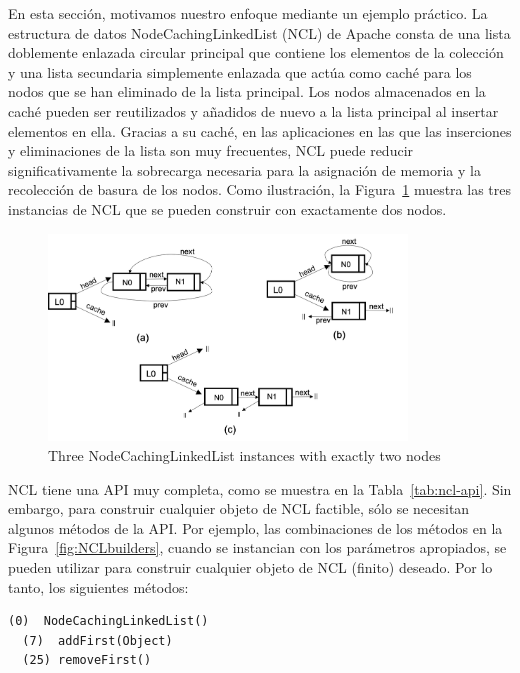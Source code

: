 En esta sección, motivamos nuestro enfoque mediante un ejemplo práctico. La estructura de datos NodeCachingLinkedList (NCL) de Apache \cite{apache} consta de una lista doblemente enlazada circular principal que contiene los elementos de la colección y una lista secundaria simplemente enlazada que actúa como caché para los nodos que se han eliminado de la lista principal. Los nodos almacenados en la caché pueden ser reutilizados y añadidos de nuevo a la lista principal al insertar elementos en ella. Gracias a su caché, en las aplicaciones en las que las inserciones y eliminaciones de la lista son muy frecuentes, NCL puede reducir significativamente la sobrecarga necesaria para la asignación de memoria y la recolección de basura de los nodos. 
Como ilustración, la Figura~\ref{fig:ncl-instances} muestra las tres instancias de NCL que se pueden construir con exactamente dos nodos.


\begin{figure}[H]
    \centering
    \includegraphics[width=0.85\textwidth]{NCL-instances.png}
    \caption{Three NodeCachingLinkedList instances with exactly two nodes}
    \label{fig:ncl-instances}
\end{figure}


NCL tiene una API muy completa, como se muestra en la Tabla~\ref{tab:ncl-api}. Sin embargo, para construir cualquier objeto de NCL factible, sólo se necesitan algunos métodos de la API. Por ejemplo, las combinaciones de los métodos en la Figura~\ref{fig:NCLbuilders}, cuando se instancian con los parámetros apropiados, se pueden utilizar para construir cualquier objeto de NCL (finito) deseado. Por lo tanto, los siguientes métodos:
\\
\begin{lstlisting}[numbers=none,label=fig:NCLbuilders, caption=Conjunto de metodos sufiente para NCL]
  (0)  NodeCachingLinkedList()
  (7)  addFirst(Object)
  (25) removeFirst()
\end{lstlisting}

